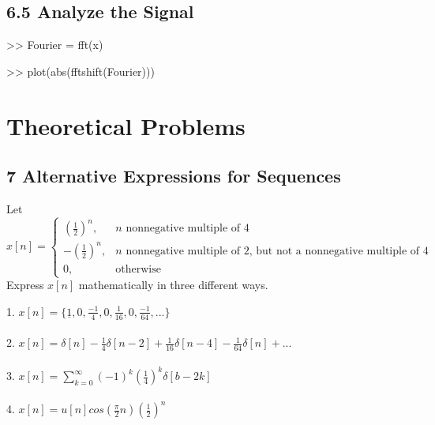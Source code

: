 \documentclass[11pt]{article}
\begin{document}
\subsection*{6.5 \hspace{3mm} Analyze the Signal}

\begin{center}

>> Fourier = fft(x)

\end{center}

\begin{center}

>> plot(abs(fftshift(Fourier)))

\end{center}

\section*{Theoretical Problems}

\subsection*{7 \hspace{3mm} Alternative Expressions for Sequences}
Let $x[n] = \begin{cases} \left(\frac{1}{2}\right)^n, & n \text{ nonnegative multiple of 4} \\ -\left(\frac{1}{2}\right)^n, & n \text{ nonnegative multiple of 2, but not a nonnegative multiple of 4} \\ 0, & \text{otherwise}\end{cases}$ \\
Express $x[n]$ mathematically in three different ways.

{\color{blue}
1. $x[n] = \{\underline{1}, 0, \frac{-1}{4}, 0, \frac{1}{16}, 0, \frac{-1}{64},... \}$ \\
\\
2. $x[n] = \delta[n]-\frac{1}{4}\delta[n-2]+\frac{1}{16}\delta[n-4]-\frac{1}{64}\delta[n]+...$ \\ \\
3. $x[n] = \sum\limits_{k=0}^\infty (-1)^k(\frac{1}{4})^k\delta[b-2k]$ \\ \\
4. $x[n] = u[n]cos\left(\frac{\pi}{2}n\right)\left(\frac{1}{2}\right)^n$ }
\end{document}
